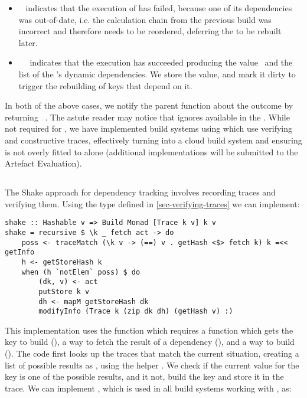 \begin{itemize}
    \item {}~ indicates that the execution of  has
    failed, because one of its dependencies  was out-of-date, i.e. the
    calculation chain from the previous build was incorrect and therefore needs
    to be reordered, deferring the  to be rebuilt later.
    \item {}~~ indicates that the
    execution has succeeded producing the value~ and the list of the
    's dynamic dependencies. We store the value, and mark it dirty to
    trigger the rebuilding of keys that depend on it.
\end{itemize}

In both of the above cases, we notify the parent  function about
the outcome by returning ~. The astute reader may notice
that  ignores  available in the .
While not required for \Excel, we have implemented build systems using
 which use verifying and constructive traces, effectively turning
\Excel into a cloud build system and ensuring  is not overly
fitted to \Excel alone (additional implementations will be submitted to the
Artefact Evaluation).

\subsection{\Shake}\label{sec-implementation-shake}


The Shake approach for dependency tracking involves recording traces and verifying them. Using the  type defined in \ref{sec-verifying-traces} we can implement:

\begin{verbatim}
shake :: Hashable v => Build Monad [Trace k v] k v
shake = recursive $ \k _ fetch act -> do
    poss <- traceMatch (\k v -> (==) v . getHash <$> fetch k) k =<< getInfo
    h <- getStoreHash k
    when (h `notElem` poss) $ do
        (dk, v) <- act
        putStore k v
        dh <- mapM getStoreHash dk
        modifyInfo (Trace k (zip dk dh) (getHash v) :)
\end{verbatim}

This implementation uses the  function which requires a function which gets the key to build (), a way to fetch the result of a dependency (), and a way to build  (). The code first looks up the traces that match the current situation, creating a list of possible results as , using the helper . We check if the current value for the key is one of the possible results, and it not, build the key and store it in the trace. We can implement , which is used in all build systems working with , as:

